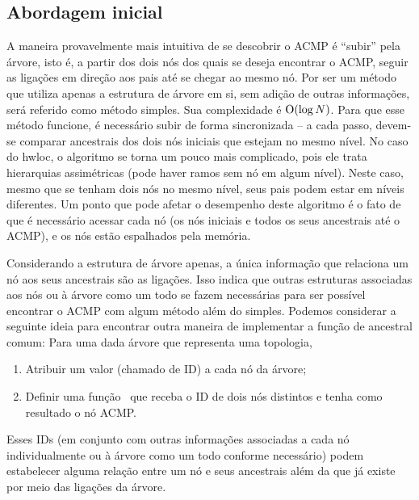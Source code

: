 \subsection{Abordagem inicial}

A maneira provavelmente mais intuitiva de se descobrir o ACMP é ``subir'' pela árvore, isto é, a partir dos dois nós dos quais se deseja encontrar o ACMP,
seguir as ligações em direção aos pais até se chegar ao mesmo nó.
Por ser um método que utiliza apenas a estrutura de árvore em si, sem adição de outras informações, será referido como método simples.
Sua complexidade é $\operatorname{O}(\log N)$.
Para que esse método funcione, é necessário subir de forma sincronizada -- a cada passo, devem-se comparar ancestrais dos dois nós iniciais que estejam no mesmo nível.
No caso do hwloc, o algoritmo se torna um pouco mais complicado, pois ele trata hierarquias assimétricas (pode haver ramos sem nó em algum nível).
Neste caso, mesmo que se tenham dois nós no mesmo nível, seus pais podem estar em níveis diferentes.
Um ponto que pode afetar o desempenho deste algoritmo é o fato de que é necessário acessar cada nó
(os nós iniciais e todos os seus ancestrais até o ACMP), e os nós estão espalhados pela memória.


Considerando a estrutura de árvore apenas, a única informação que relaciona um nó aos seus ancestrais são as ligações.
Isso indica que outras estruturas associadas aos nós ou à árvore como um todo se fazem necessárias
para ser possível encontrar o ACMP com algum método além do simples.
Podemos considerar a seguinte ideia para encontrar outra maneira de implementar a função de ancestral comum:
Para uma dada árvore que representa uma topologia,
\begin{enumerate}
	\item Atribuir um valor (chamado de ID) a cada nó da árvore;
	\item Definir uma função \ACMPIDs\ que receba o ID de dois nós distintos e tenha como resultado o nó ACMP.
\end{enumerate}
Esses IDs (em conjunto com outras informações associadas a cada nó individualmente ou à árvore como um todo conforme necessário)
podem estabelecer alguma relação entre um nó e seus ancestrais além da que já existe por meio das ligações da árvore.

